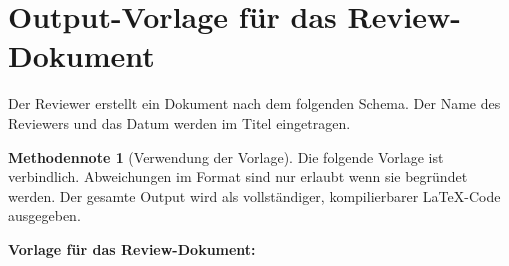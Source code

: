 \documentclass[11pt,a4paper]{article}
\theoremstyle{definition}
\newtheorem{methodennote}{Methodennote}[section]
\begin{document}
\section{Output-Vorlage f\"{u}r das Review-Dokument}

Der Reviewer erstellt ein Dokument nach dem folgenden Schema. Der Name des Reviewers
und das Datum werden im Titel eingetragen.

\begin{methodennote}[Verwendung der Vorlage]
Die folgende Vorlage ist verbindlich. Abweichungen im Format sind nur erlaubt wenn
sie begr\"{u}ndet werden. Der gesamte Output wird als vollst\"{a}ndiger, kompilierbarer
LaTeX-Code ausgegeben.
\end{methodennote}

\newpage
\noindent\textbf{Vorlage f\"{u}r das Review-Dokument:}
\end{document}
